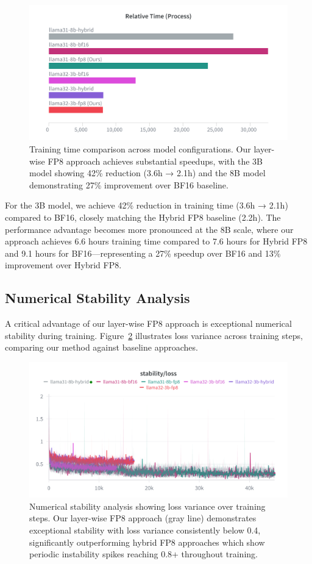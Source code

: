 \begin{figure}[h]
    \centering
    \includegraphics[width=0.9\linewidth]{figures/c4/training_time.png}
    \caption{Training time comparison across model configurations. Our layer-wise FP8 approach achieves substantial speedups, with the 3B model showing 42\% reduction (3.6h → 2.1h) and the 8B model demonstrating 27\% improvement over BF16 baseline.}
    \label{fig:training_time_comparison}
\end{figure}

For the 3B model, we achieve 42\% reduction in training time (3.6h → 2.1h) compared to BF16, closely matching the Hybrid FP8 baseline (2.2h). The performance advantage becomes more pronounced at the 8B scale, where our approach achieves 6.6 hours training time compared to 7.6 hours for Hybrid FP8 and 9.1 hours for BF16—representing a 27\% speedup over BF16 and 13\% improvement over Hybrid FP8.

\subsection{Numerical Stability Analysis}

A critical advantage of our layer-wise FP8 approach is exceptional numerical stability during training. Figure~\ref{fig:stability_comparison} illustrates loss variance across training steps, comparing our method against baseline approaches.

\begin{figure}[h]
    \centering
    \includegraphics[width=0.9\linewidth]{figures/c4/numeric_stability.png}
    \caption{Numerical stability analysis showing loss variance over training steps. Our layer-wise FP8 approach (gray line) demonstrates exceptional stability with loss variance consistently below 0.4, significantly outperforming hybrid FP8 approaches which show periodic instability spikes reaching 0.8+ throughout training.}
    \label{fig:stability_comparison}
\end{figure}

